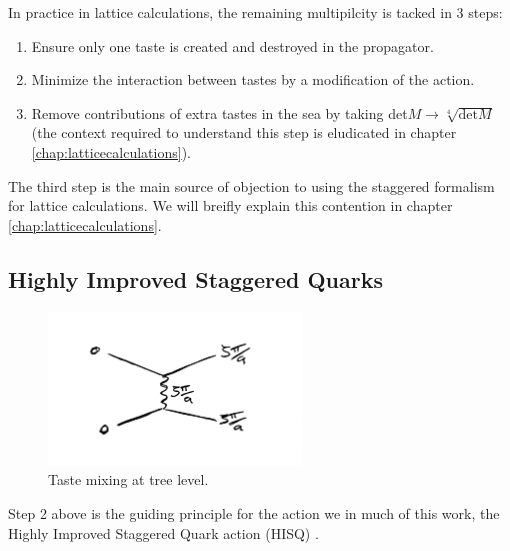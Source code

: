 In practice in lattice calculations, the remaining multipilcity is tacked in 3 steps:
\begin{enumerate}
	\item
	Ensure only one taste is created and destroyed in the propagator.
	\item
	Minimize the interaction between tastes by a modification of the action.
	\item
	Remove contributions of extra tastes in the sea by taking det$M \to \sqrt[4]{\text{det}M}$ (the context required to understand this step is eludicated in chapter \ref{chap:latticecalculations}).
\end{enumerate}
The third step is the main source of objection to using the staggered formalism for lattice calculations. We will breifly explain this contention in chapter \ref{chap:latticecalculations}.


\subsection{Highly Improved Staggered Quarks}

\begin{figure}
  \vspace{-10pt}
  \begin{center}
    \includegraphics[width=
   0.6\textwidth]{images/taste_exchange.jpg}
  \end{center}
  \vspace{-30pt}
  \caption{Taste mixing at tree level.}
  \label{fig:tastemixing}
\end{figure}

Step 2 above is the guiding principle for the action we in much of this work, the Highly Improved Staggered Quark action (HISQ) \cite{Follana:2006rc}. 

